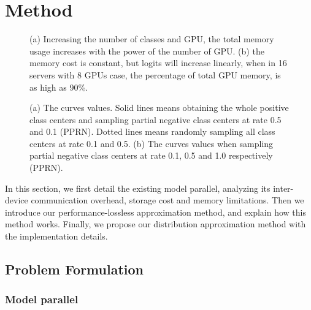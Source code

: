 \documentclass[letterpaper]{article} \usepackage{style/aaai21}  \usepackage{times}  \usepackage{helvet} \usepackage{courier}  \usepackage[hyphens]{url}  \usepackage{graphicx} \usepackage{color}
\begin{document}
\section{Method}


\begin{figure}[t]
	\centering
	\caption{(a) Increasing the number of classes and GPU, the total memory usage increases with the power of the number of GPU. (b) the  memory cost is constant, but logits will increase linearly, when in 16 servers with 8 GPUs case, the percentage of total GPU memory, is as high as 90\%.}
	\label{fig9}
\end{figure}


\begin{figure}[t]
	\centering
 	\caption{(a) The curves  values. Solid lines means obtaining the whole positive class centers and sampling partial negative class centers at rate 0.5 and 0.1 (PPRN). Dotted lines means randomly sampling all class centers at rate 0.1 and 0.5. (b) The curves  values when sampling partial negative class centers at rate 0.1, 0.5 and 1.0 respectively (PPRN). }
	\label{PositiveRandomP}
\end{figure}
In this section, we first detail the existing model parallel, analyzing its inter-device communication overhead, storage cost and memory limitations. Then we introduce our performance-lossless approximation method, and explain how this method works. Finally, we propose our distribution approximation method with the implementation details.

\subsection{Problem Formulation}
\subsubsection{Model parallel}
\end{document}
